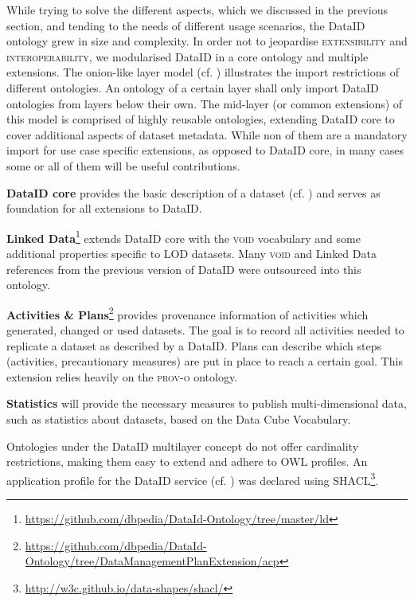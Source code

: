 \documentclass[runningheads,a4paper]{llncs}
\newcommand{\extensibility}{{\scshape extensibility}\xspace}
\newcommand{\interoperability}{{\scshape interoperability}\xspace}
\newcommand{\prov}{{\scshape prov-o}\xspace}
\newcommand{\void}{{\scshape void}\xspace}
\newcommand\footnoteurl[1]{\footnote{\scriptsize\url{#1}}}
\begin{document}
While trying to solve the different aspects, which we discussed in the previous section, and tending to the needs of different usage scenarios, the DataID ontology grew in size and complexity.
In order not to jeopardise \extensibility and \interoperability, we modularised DataID in a core ontology and multiple extensions. The onion-like layer model (cf. ) illustrates the import restrictions of different ontologies. An ontology of a certain layer shall only import DataID ontologies from layers below their own.
The mid-layer (or common extensions) of this model is comprised of highly reusable ontologies, extending DataID core to cover additional aspects of dataset metadata. While non of them are a mandatory import for use case specific extensions, as opposed to DataID core, in many cases some or all of them will be useful contributions.

\textbf{DataID core} provides the basic description of a dataset (cf. ) and serves as foundation for all extensions to DataID.

\textbf{Linked Data}\footnoteurl{https://github.com/dbpedia/DataId-Ontology/tree/master/ld} extends DataID core with the \void vocabulary\cite{void} and some additional properties specific to LOD datasets. Many \void and Linked Data references from the previous version of DataID were outsourced into this ontology.

\textbf{Activities \& Plans}\footnoteurl{https://github.com/dbpedia/DataId-Ontology/tree/DataManagementPlanExtension/acp} provides provenance information of activities which generated, changed or used datasets. The goal is to record all activities needed to replicate a dataset as described by a DataID. Plans can describe which steps (activities, precautionary measures) are put in place to reach a certain goal. This extension relies heavily on the \prov ontology\cite{prov}.

\textbf{Statistics} will provide the necessary measures to publish multi-dimensional data, such as statistics about datasets, based on the Data Cube Vocabulary\cite{datacube}.

Ontologies under the DataID multilayer concept do not offer cardinality restrictions, making them easy to extend and adhere to OWL profiles. An application profile for the DataID service (cf. ) was declared using SHACL\footnoteurl{http://w3c.github.io/data-shapes/shacl/}.
\end{document}
